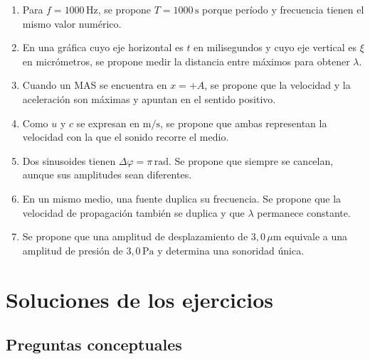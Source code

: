 \begin{enumerate}[label=\textbf{D\arabic*.},leftmargin=*]
    \item Para \(f=1000\,\text{Hz}\), se propone
    \(T=1000\,\text{s}\) porque período y frecuencia tienen el mismo valor
    numérico.

    \item En una gráfica cuyo eje horizontal es \(t\) en milisegundos y cuyo
    eje vertical es \(\xi\) en micrómetros, se propone medir la distancia entre
    máximos para obtener \(\lambda\).

    \item Cuando un MAS se encuentra en \(x=+A\), se propone que la velocidad
    y la aceleración son máximas y apuntan en el sentido positivo.

    \item Como \(u\) y \(c\) se expresan en
    \(\text{m}/\text{s}\), se propone que ambas representan la velocidad con
    la que el sonido recorre el medio.

    \item Dos sinusoides tienen
    \(\Delta\varphi=\pi\,\text{rad}\). Se propone que siempre se cancelan,
    aunque sus amplitudes sean diferentes.

    \item En un mismo medio, una fuente duplica su frecuencia. Se propone que
    la velocidad de propagación también se duplica y que \(\lambda\)
    permanece constante.

    \item Se propone que una amplitud de desplazamiento de
    \(3{,}0\,\mu\text{m}\) equivale a una amplitud de presión de
    \(3{,}0\,\text{Pa}\) y determina una sonoridad única.
\end{enumerate}

\section{Soluciones de los ejercicios}
\label{sec:u3-soluciones}

\subsection*{Preguntas conceptuales}

